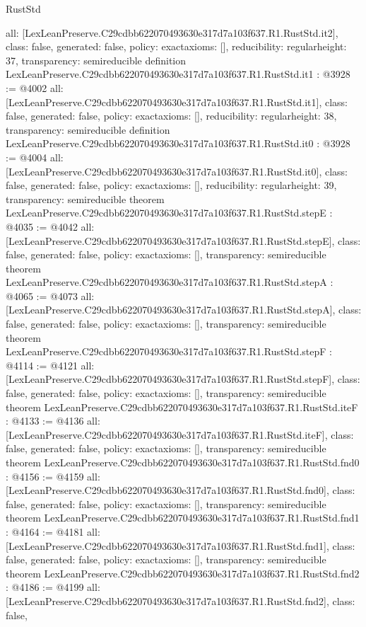 \begin{lexlean}{RustStd}
\begin{coremodule}
{  all: [LexLeanPreserve.C29cdbb622070493630e317d7a103f637.R1.RustStd.it2],
  class: false,
  generated: false,
  policy: exact{axioms: []},
  reducibility: regular{height: 37},
  transparency: semireducible
}
definition LexLeanPreserve.C29cdbb622070493630e317d7a103f637.R1.RustStd.it1 : @3928 := @4002 {
  all: [LexLeanPreserve.C29cdbb622070493630e317d7a103f637.R1.RustStd.it1],
  class: false,
  generated: false,
  policy: exact{axioms: []},
  reducibility: regular{height: 38},
  transparency: semireducible
}
definition LexLeanPreserve.C29cdbb622070493630e317d7a103f637.R1.RustStd.it0 : @3928 := @4004 {
  all: [LexLeanPreserve.C29cdbb622070493630e317d7a103f637.R1.RustStd.it0],
  class: false,
  generated: false,
  policy: exact{axioms: []},
  reducibility: regular{height: 39},
  transparency: semireducible
}
theorem LexLeanPreserve.C29cdbb622070493630e317d7a103f637.R1.RustStd.stepE : @4035 := @4042 {
  all: [LexLeanPreserve.C29cdbb622070493630e317d7a103f637.R1.RustStd.stepE],
  class: false,
  generated: false,
  policy: exact{axioms: []},
  transparency: semireducible
}
theorem LexLeanPreserve.C29cdbb622070493630e317d7a103f637.R1.RustStd.stepA : @4065 := @4073 {
  all: [LexLeanPreserve.C29cdbb622070493630e317d7a103f637.R1.RustStd.stepA],
  class: false,
  generated: false,
  policy: exact{axioms: []},
  transparency: semireducible
}
theorem LexLeanPreserve.C29cdbb622070493630e317d7a103f637.R1.RustStd.stepF : @4114 := @4121 {
  all: [LexLeanPreserve.C29cdbb622070493630e317d7a103f637.R1.RustStd.stepF],
  class: false,
  generated: false,
  policy: exact{axioms: []},
  transparency: semireducible
}
theorem LexLeanPreserve.C29cdbb622070493630e317d7a103f637.R1.RustStd.iteF : @4133 := @4136 {
  all: [LexLeanPreserve.C29cdbb622070493630e317d7a103f637.R1.RustStd.iteF],
  class: false,
  generated: false,
  policy: exact{axioms: []},
  transparency: semireducible
}
theorem LexLeanPreserve.C29cdbb622070493630e317d7a103f637.R1.RustStd.fnd0 : @4156 := @4159 {
  all: [LexLeanPreserve.C29cdbb622070493630e317d7a103f637.R1.RustStd.fnd0],
  class: false,
  generated: false,
  policy: exact{axioms: []},
  transparency: semireducible
}
theorem LexLeanPreserve.C29cdbb622070493630e317d7a103f637.R1.RustStd.fnd1 : @4164 := @4181 {
  all: [LexLeanPreserve.C29cdbb622070493630e317d7a103f637.R1.RustStd.fnd1],
  class: false,
  generated: false,
  policy: exact{axioms: []},
  transparency: semireducible
}
theorem LexLeanPreserve.C29cdbb622070493630e317d7a103f637.R1.RustStd.fnd2 : @4186 := @4199 {
  all: [LexLeanPreserve.C29cdbb622070493630e317d7a103f637.R1.RustStd.fnd2],
  class: false,
}
\end{coremodule}
\end{lexlean}
